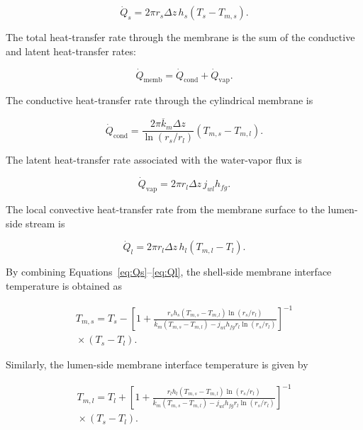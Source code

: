 \documentclass[14pt,letterpaper,fleqn]{extarticle}
\begin{document}
\begin{equation}
\dot{Q}_s
=
2\pi r_s\Delta z\,h_s
\left(
T_s-T_{m,s}
\right).
\label{eq:Qs}
\end{equation}

The total heat-transfer rate through the membrane is the sum of the conductive
and latent heat-transfer rates:

\begin{equation}
\dot{Q}_{\mathrm{memb}}
=
\dot{Q}_{\mathrm{cond}}
+
\dot{Q}_{\mathrm{vap}}.
\label{eq:Qmemb}
\end{equation}

The conductive heat-transfer rate through the cylindrical membrane is

\begin{equation}
\dot{Q}_{\mathrm{cond}}
=
\frac{
2\pi\overline{k}_m\Delta z
}{
\ln\left(r_s/r_l\right)
}
\left(
T_{m,s}-T_{m,l}
\right).
\label{eq:Qcond}
\end{equation}

The latent heat-transfer rate associated with the water-vapor flux is

\begin{equation}
\dot{Q}_{\mathrm{vap}}
=
2\pi r_l\Delta z\,
j_{wl}h_{fg}.
\label{eq:Qvap}
\end{equation}

The local convective heat-transfer rate from the membrane surface to the
lumen-side stream is

\begin{equation}
\dot{Q}_l
=
2\pi r_l\Delta z\,h_l
\left(
T_{m,l}-T_l
\right).
\label{eq:Ql}
\end{equation}

By combining Equations~\eqref{eq:Qs}--\eqref{eq:Ql}, the shell-side membrane
interface temperature is obtained as

\begin{multline}
T_{m,s}
=
T_s
-
\left[
1
+
\frac{
r_s h_s
\left(
T_{m,s}-T_{m,l}
\right)
\ln\left(r_s/r_l\right)
}{
\overline{k}_m
\left(
T_{m,s}-T_{m,l}
\right)
-
j_{wl}h_{fg}r_l
\ln\left(r_s/r_l\right)
}
\right]^{-1}
\\
{}\times
\left(
T_s-T_l
\right).
\label{eq:Tms}
\end{multline}

Similarly, the lumen-side membrane interface temperature is given by

\begin{multline}
T_{m,l}
=
T_l
+
\left[
1
+
\frac{
r_l h_l
\left(
T_{m,s}-T_{m,l}
\right)
\ln\left(r_s/r_l\right)
}{
\overline{k}_m
\left(
T_{m,s}-T_{m,l}
\right)
-
j_{wl}h_{fg}r_l
\ln\left(r_s/r_l\right)
}
\right]^{-1}
\\
{}\times
\left(
T_s-T_l
\right).
\label{eq:Tml}
\end{multline}
\end{document}
